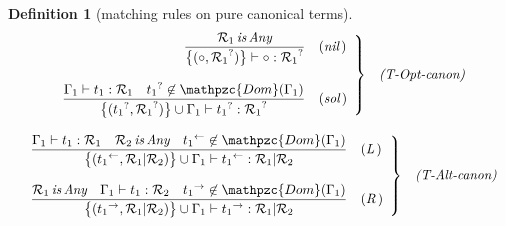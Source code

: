 \documentclass[12pt]{article}
\newtheorem{Definition}{Definition}[section]
\begin{document}
\begin{Definition}[matching rules on pure canonical terms]
\begin{displaymath}
\begin{array}{c}
      \begin{array}{rl}
        \left. \begin{array}{rl}
          \dfrac{
            \mathcal{R}_1 \,\text{\it is}\, \text{\it Any}
          }{
            \bigl\{(\circ, {\mathcal{R}_1}^? ) \bigr\} \vdash
            \circ : {\mathcal{R}_1}^?
          }  &  (\text{\it nil}\,)  \\
          \\
          \dfrac{
            \Gamma_1 \vdash t_1 : \mathcal{R}_1
            \quad {t_1}^? \not\in \mathpzc{Dom}(\Gamma_1)
          }{
            \bigl\{({t_1}^?, {\mathcal{R}_1}^?) \bigr\} \cup \Gamma_1 \vdash
                   {t_1}^? : {\mathcal{R}_1}^?
          }  &  (\text{\it sol}\,)
        \end{array} \right\}  &  \text{\it (T-Opt-canon)}
      \end{array}  \\
      
      \\
      \begin{array}{rl}
        \left. \begin{array}{rl}
          \dfrac{
            \Gamma_1 \vdash t_1 : \mathcal{R}_1
            \quad \mathcal{R}_2 \,\text{\it is}\, \text{\it Any}
            \quad {t_1}^{\leftarrow} \not\in \mathpzc{Dom}(\Gamma_1)
          }{
            \bigl\{({t_1}^\leftarrow, \mathcal{R}_1 | \mathcal{R}_2)
             \bigr\} \cup \Gamma_1 \vdash {t_1}^\leftarrow :
              \mathcal{R}_1 | \mathcal{R}_2
          }  &  (\text{\it L}\,)  \\
          \\
          \dfrac{
            \mathcal{R}_1 \,\text{\it is}\, \text{\it Any}
            \quad \Gamma_1 \vdash t_1 : \mathcal{R}_2
            \quad {t_1}^{\rightarrow} \not\in \mathpzc{Dom}(\Gamma_1)
          }{
            \bigl\{({t_1}^{\rightarrow}, \mathcal{R}_1 | \mathcal{R}_2)
             \bigr\} \cup \Gamma_1 \vdash {t_1}^\rightarrow :
              \mathcal{R}_1 | \mathcal{R}_2
          }  &  (\text{\it R}\,)
        \end{array} \right\}  &  \text{\it (T-Alt-canon)}
      \end{array}  
    \end{array}
  \end{displaymath}  
\end{Definition}
\end{document}
